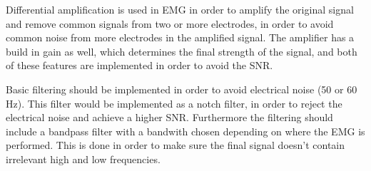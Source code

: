 Differential amplification is used in EMG in order to amplify the original signal and remove common signals from two or more electrodes, in order to avoid common noise from more electrodes in the amplified signal. The amplifier has a build in gain as well, which determines the final strength of the signal, and both of these features are implemented in order to avoid the SNR.\cite{cram2012}

Basic filtering should be implemented in order to avoid electrical noise (50 or 60 Hz). This filter would be implemented as a notch filter, in order to reject the electrical noise and achieve a higher SNR. Furthermore the filtering should include a bandpass filter with a bandwith chosen depending on where the EMG is performed. This is done in order to make sure the final signal doesn't contain irrelevant high and low frequencies.\cite{cram2012}